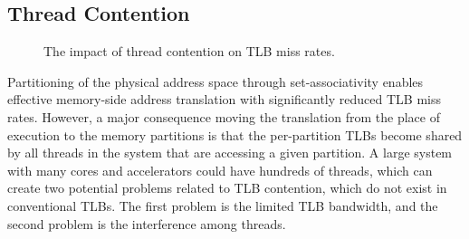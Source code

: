 \subsection{Thread Contention}

\begin{figure}[t]
	\centering
	\hspace{.01in}
	\caption{The impact of thread contention on TLB miss rates.}
	\label{fig:contention}
\end{figure}

Partitioning of the physical address space through set-associativity enables effective memory-side address translation with significantly reduced TLB miss rates.  However, a major consequence moving the translation from the place of execution to the memory partitions is that the per-partition TLBs become shared by all threads in the system that are accessing a given partition. A large system with many cores and accelerators could have hundreds of threads, which can create two potential problems related to TLB contention, which do not exist in conventional TLBs. The first problem is the limited TLB bandwidth, and the second problem is the interference among threads. 

